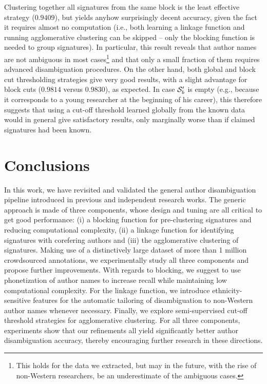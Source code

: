 \documentclass{article}
\begin{document}
Clustering together all signatures from the same block is the least effective
strategy ($0.9409$), but yields anyhow surprisingly decent accuracy, given the
fact it requires almost no computation (i.e., both learning a linkage function
and running agglomerative clustering can be skipped -- only the blocking
function is needed to group signatures). In particular, this result reveals
that author names are not ambiguous in most cases\footnote{This holds for the
data we extracted, but may in the future, with the rise of non-Western
researchers, be an underestimate of the ambiguous cases.} and that only a small
fraction of them requires advanced disambiguation procedures. On the other
hand, both global and block cut thresholding strategies give very good results,
with a slight advantage for block cuts ($0.9814$ versus $0.9830$), as expected.
In case ${\cal S}^\prime_b$ is empty (e.g., because it corresponds to a young
researcher at the beginning of his career), this therefore suggests that using
a cut-off threshold learned globally from the known data would in general give
satisfactory results, only marginally worse than if claimed signatures had been
known.



\section{Conclusions}
\label{conclusions}

In this work, we have revisited and validated the general author disambiguation
pipeline introduced in previous and independent research works. The generic
approach is made of three components, whose design and tuning are all critical
to get good performance: (i) a blocking function for pre-clustering signatures
and reducing computational complexity, (ii) a linkage function for identifying
signatures with corefering authors and (iii) the agglomerative clustering of
signatures. Making use of a distinctively large dataset of more than 1 million
crowdsourced annotations, we experimentally study all three components and
propose further improvements. With regards to blocking, we suggest to use
phonetization of author names to increase recall while maintaining low
computational complexity. For the linkage function, we introduce
ethnicity-sensitive features for the automatic tailoring of disambiguation to non-Western
author names whenever necessary. Finally, we explore semi-supervised cut-off
threshold strategies for agglomerative clustering. For all three components,
experiments show that our refinements all yield significantly better author
disambiguation accuracy, thereby encouraging further research in these directions.
\end{document}
